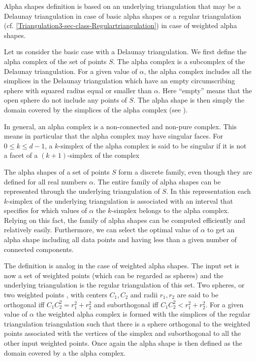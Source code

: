 Alpha shapes definition is based on an underlying
triangulation that may be a Delaunay triangulation 
in case of basic alpha shapes or a regular triangulation 
(cf. \ref{Triangulation3-sec-class-Regulartriangulation})
in case of weighted alpha shapes.

Let us consider the basic case with a Delaunay triangulation.
We first define the alpha complex  of the set of points $S$. 
The  alpha complex is a subcomplex 
of the Delaunay triangulation.
For a given value of $\alpha$, the alpha complex includes
all the simplices in the Delaunay triangulation which have
an empty  circumscribing sphere with squared radius equal or smaller than $\alpha$.
Here ``empty'' means  that the open sphere 
do not include  any points of $S$.
The alpha shape is then simply the domain covered by the simplices
of the alpha complex (see \cite{em-tdas-94}).

In general, an alpha complex is a non-connected and non-pure complex.
This means in particular that the alpha complex may have
singular faces.  For $0 \leq k \leq d-1$,
a $k$-simplex of the alpha complex  is said to be
singular if it is not a facet of a $(k+1)$-simplex of the complex

The alpha shapes of a  set of points 
$S$ form a discrete family, even though they
are defined for all real numbers $\alpha$.
The entire family of alpha shapes can be represented 
through  the underlying triangulation of $S$. In this representation
each $k$-simplex of the underlying triangulation is associated with an
interval that specifies for which values of $\alpha$ the $k$-simplex
belongs to the alpha complex. Relying on this fact, the family of
 alpha shapes can be computed efficiently and relatively
easily. Furthermore, we can select the optimal value
of  $\alpha$ to get an alpha shape including all data points
and having   less than a given number of connected components.

The definition is analog in the case of weighted alpha shapes.
The input set is now a set of weighted points (which can be regarded
as spheres) and the underlying triangulation 
is the regular triangulation of this set.
Two spheres, or two weighted points , with centers $C_1, C_2$
and  radii $r_1, r_2 $ are said to be orthogonal iff 
$ C_1C_2 ^2 = r_1^2 + r_2^2$ and suborthogonal
iff  $ C_1C_2 ^2 < r_1^2 + r_2^2$.
For a given value of $\alpha$
the weighted alpha complex is formed with the simplices of the 
regular triangulation triangulation
such that there is a sphere orthogonal to the weighted points associated
with the vertices of the simplex  and suborthogonal to all the other
input weighted points. Once again the alpha shape is then defined as
the domain covered by a the alpha complex.

